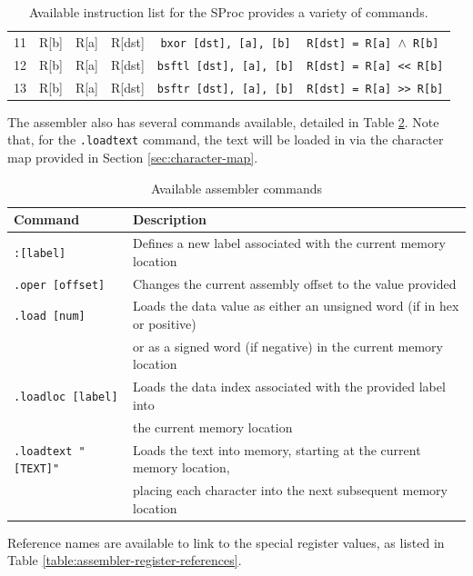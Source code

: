 \documentclass{article}
\begin{document}
\begin{table}[h!]
\begin{footnotesize}
\begin{tabular}{cccc|c|l}
			11 & R[b] & R[a] & R[dst] & \texttt{bxor [dst], [a], [b]} & \texttt{R[dst] = R[a] $\wedge$ R[b]} \\
			12 & R[b] & R[a] & R[dst] & \texttt{bsftl [dst], [a], [b]} & \texttt{R[dst] = R[a] << R[b]} \\
			13 & R[b] & R[a] & R[dst] & \texttt{bsftr [dst], [a], [b]} & \texttt{R[dst] = R[a] >> R[b]} \\
			\hline
		\end{tabular}
	\end{footnotesize}
	\caption{Available instruction list for the SProc provides a variety of commands.}
	\label{table:instruction-table}
\end{table}

The assembler also has several commands available, detailed in Table \ref{table:assembler-commands}. Note that, for the \texttt{.loadtext} command, the text will be loaded in via the character map provided in Section \ref{sec:character-map}.

\begin{table}[h!]
	\centering
	\begin{tabular}{l|l}
		\hline
		Command & Description \\
		\hline
		\texttt{:[label]} & Defines a new label associated with the current memory location \\
		\texttt{.oper [offset]} & Changes the current assembly offset to the value provided \\
		\texttt{.load [num]} & Loads the data value as either an unsigned word (if in hex or positive)\\
		& or as a signed word (if negative) in the current memory location \\
		\texttt{.loadloc [label]} & Loads the data index associated with the provided label into \\
		& the current memory location \\
		\texttt{.loadtext "[TEXT]"} & Loads the text into memory, starting at the current memory location, \\
		& placing each character into the next subsequent memory location \\
		\hline
	\end{tabular}
	\caption{Available assembler commands}
	\label{table:assembler-commands}
\end{table}

Reference names are available to link to the special register values, as listed in Table \ref{table:assembler-register-references}.
\end{document}
